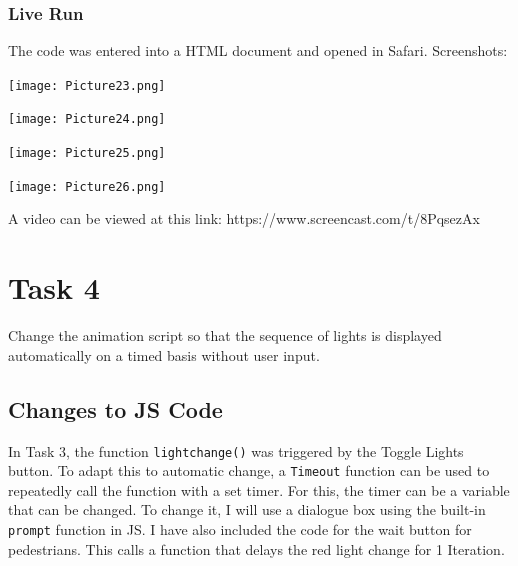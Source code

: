 \documentclass[a4paper]{article}
\begin{document}
\subsubsection{Live Run}
The code was entered into a HTML document and opened in Safari. Screenshots: \par
\noindent\texttt{[image: Picture23.png]} \par
\noindent\texttt{[image: Picture24.png]} \par
\noindent\texttt{[image: Picture25.png]} \par
\noindent\texttt{[image: Picture26.png]} \par
A video can be viewed at this link:
https://www.screencast.com/t/8PqsezAx

\newpage
\section{Task 4}
Change the animation script so that the sequence of lights is displayed automatically on a timed basis without user input.
\subsection{Changes to JS Code}
In Task 3, the function \verb|lightchange()| was triggered by the Toggle Lights button. To adapt this to automatic change, a \verb|Timeout| function can be used to repeatedly call the function with a set timer. For this, the timer can be a variable that can be changed. To change it, I will use a dialogue box using the built-in \verb|prompt| function in JS.
I have also included the code for the wait button for pedestrians. This calls a function that delays the red light change for 1 Iteration.
\end{document}
